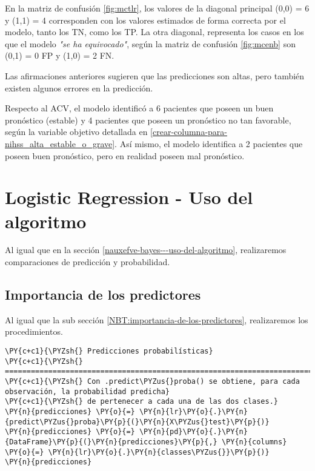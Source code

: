 	En la matriz de confusión \ref{fig:mctlr}, los valores de la diagonal principal (0,0) = 6 y (1,1) = 4 corresponden con los valores estimados de forma correcta por el modelo, tanto los TN, como los TP. La otra diagonal, representa los casos en los que el modelo \textit{"se ha equivocado"}, según la matriz de confusión \ref{fig:mcenb} son (0,1) = 0 FP y (1,0) = 2 FN.
\par Las afirmaciones anteriores sugieren que las predicciones son altas, pero también existen algunos errores en la predicción.
\par Respecto al ACV, el modelo identificó a 6 pacientes que poseen un buen pronóstico (estable) y 4 pacientes que poseen un pronóstico no tan favorable, según la variable objetivo detallada en \ref{crear-columna-para-nihss_alta_estable_o_grave}. Así mismo, el modelo identifica a 2 pacientes que poseen buen pronóstico, pero en realidad poseen mal pronóstico.\\
    

    \hypertarget{logistic-regression---uso-del-algoritmo}{%
\section{Logistic Regression - Uso del algoritmo}\label{logistic-regression---uso-del-algoritmo}}

	Al igual que en la sección \ref{nauxefve-bayes---uso-del-algoritmo}, realizaremos comparaciones de predicción y probabilidad.

    \hypertarget{importancia-de-los-predictores}{%
\subsection{Importancia de los predictores}\label{importancia-de-los-predictores}}

 Al igual que la sub sección \ref{NBT:importancia-de-los-predictores}, realizaremos los procedimientos.

    \begin{tcolorbox}[breakable, size=fbox, boxrule=1pt, pad at break*=1mm,colback=cellbackground, colframe=cellborder]
\begin{Verbatim}[commandchars=\\\{\}]
\PY{c+c1}{\PYZsh{} Predicciones probabilísticas}
\PY{c+c1}{\PYZsh{} ==============================================================================}
\PY{c+c1}{\PYZsh{} Con .predict\PYZus{}proba() se obtiene, para cada observación, la probabilidad predicha}
\PY{c+c1}{\PYZsh{} de pertenecer a cada una de las dos clases.}
\PY{n}{predicciones} \PY{o}{=} \PY{n}{lr}\PY{o}{.}\PY{n}{predict\PYZus{}proba}\PY{p}{(}\PY{n}{X\PYZus{}test}\PY{p}{)}
\PY{n}{predicciones} \PY{o}{=} \PY{n}{pd}\PY{o}{.}\PY{n}{DataFrame}\PY{p}{(}\PY{n}{predicciones}\PY{p}{,} \PY{n}{columns} \PY{o}{=} \PY{n}{lr}\PY{o}{.}\PY{n}{classes\PYZus{}}\PY{p}{)}
\PY{n}{predicciones}
\end{Verbatim}
\end{tcolorbox}

